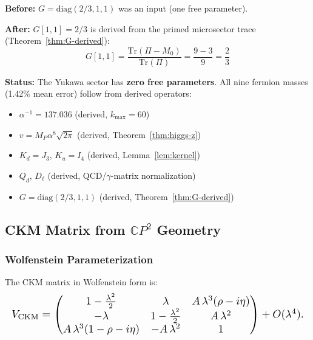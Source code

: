 \begin{tcolorbox}[colback=green!5!white, colframe=green!60!black, title={$G$ Operator: DERIVED}]
\textbf{Before:} $G = \mathrm{diag}(2/3, 1, 1)$ was an input (one free parameter).

\textbf{After:} $G[1,1] = 2/3$ is derived from the primed microsector trace (Theorem~\ref{thm:G-derived}):
\begin{equation*}
G[1,1] = \frac{\mathrm{Tr}(\Pi - M_0)}{\mathrm{Tr}(\Pi)} = \frac{9 - 3}{9} = \frac{2}{3}
\end{equation*}

\textbf{Status:} The Yukawa sector has \textbf{zero free parameters}. All nine fermion masses 
(1.42\% mean error) follow from derived operators:
\begin{itemize}[nosep]
\item $\alpha^{-1} = 137.036$ (derived, $k_{\max} = 60$)
\item $v = M_P \alpha^8 \sqrt{2\pi}$ (derived, Theorem~\ref{thm:higgs-z})
\item $K_d = J_3$, $K_u = I_4$ (derived, Lemma~\ref{lem:kernel})
\item $Q_d$, $D_\ell$ (derived, QCD/$\gamma$-matrix normalization)
\item $G = \mathrm{diag}(2/3, 1, 1)$ (derived, Theorem~\ref{thm:G-derived})
\end{itemize}
\end{tcolorbox}

\subsection{CKM Matrix from $\mathbb{C}P^2$ Geometry}\label{app:ckm-details}

\subsubsection{Wolfenstein Parameterization}

The CKM matrix in Wolfenstein form is:
\begin{equation}
\resizebox{\columnwidth}{!}{$
V_{\rm CKM} = 
\begin{pmatrix} 
1 - \tfrac{\lambda^2}{2} & \lambda & A\,\lambda^3(\rho - i\eta) \\
-\lambda & 1 - \tfrac{\lambda^2}{2} & A\,\lambda^2 \\
A\,\lambda^3(1 - \rho - i\eta) & -A\,\lambda^2 & 1
\end{pmatrix} + O(\lambda^4).
$}
\end{equation}


